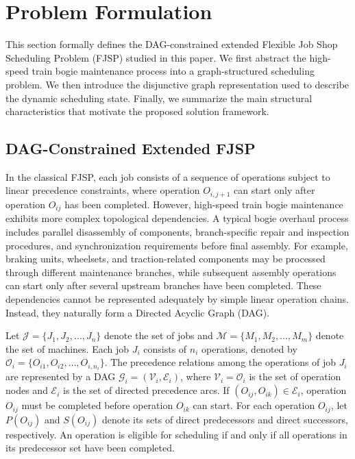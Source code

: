 \section{Problem Formulation}
\label{sec:formulation}

This section formally defines the DAG-constrained extended Flexible Job Shop Scheduling Problem (FJSP) studied in this paper. We first abstract the high-speed train bogie maintenance process into a graph-structured scheduling problem. We then introduce the disjunctive graph representation used to describe the dynamic scheduling state. Finally, we summarize the main structural characteristics that motivate the proposed solution framework.


\subsection{DAG-Constrained Extended FJSP}
\label{sec:dag_fjsp}

In the classical FJSP, each job consists of a sequence of operations subject to linear precedence constraints, where operation $O_{i,j+1}$ can start only after operation $O_{ij}$ has been completed. However, high-speed train bogie maintenance exhibits more complex topological dependencies. A typical bogie overhaul process includes parallel disassembly of components, branch-specific repair and inspection procedures, and synchronization requirements before final assembly. For example, braking units, wheelsets, and traction-related components may be processed through different maintenance branches, while subsequent assembly operations can start only after several upstream branches have been completed. These dependencies cannot be represented adequately by simple linear operation chains. Instead, they naturally form a Directed Acyclic Graph (DAG).

Let $\mathcal{J}=\{J_1,J_2,\dots,J_n\}$ denote the set of jobs and $\mathcal{M}=\{M_1,M_2,\dots,M_m\}$ denote the set of machines. Each job $J_i$ consists of $n_i$ operations, denoted by $\mathcal{O}_i=\{O_{i1},O_{i2},\dots,O_{i,n_i}\}$. The precedence relations among the operations of job $J_i$ are represented by a DAG $\mathcal{G}_i=(\mathcal{V}_i,\mathcal{E}_i)$, where $\mathcal{V}_i=\mathcal{O}_i$ is the set of operation nodes and $\mathcal{E}_i$ is the set of directed precedence arcs. If $(O_{ij},O_{ik})\in\mathcal{E}_i$, operation $O_{ij}$ must be completed before operation $O_{ik}$ can start. For each operation $O_{ij}$, let $P(O_{ij})$ and $S(O_{ij})$ denote its sets of direct predecessors and direct successors, respectively. An operation is eligible for scheduling if and only if all operations in its predecessor set have been completed.

